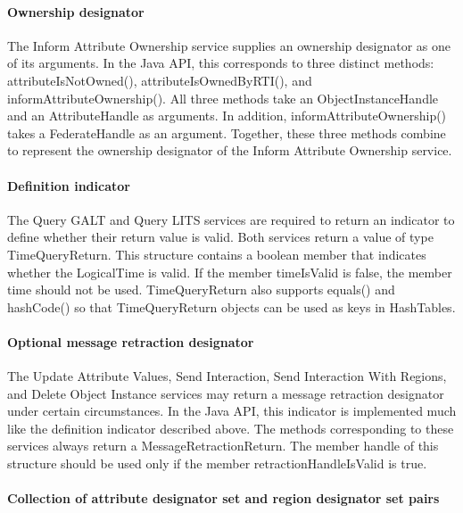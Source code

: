 \begin{compactstdpage}
    \paragraph{Ownership designator}

    The Inform Attribute Ownership \rtiinitiated{} service supplies an ownership designator as one of its arguments. In the Java API, this corresponds to three distinct methods: attributeIsNotOwned(), attributeIsOwnedByRTI(), and informAttributeOwnership(). All three methods take an ObjectInstanceHandle and an AttributeHandle as arguments. In addition, informAttributeOwnership() takes a FederateHandle as an argument. Together, these three methods combine to represent the ownership designator of the Inform Attribute Ownership \rtiinitiated{} service.

    \paragraph{Definition indicator}

    The Query GALT and Query LITS services are required to return an indicator to define whether their return value is valid. Both services return a value of type TimeQueryReturn. This structure contains a boolean member that indicates whether the LogicalTime is valid. If the member timeIsValid is false, the member time should not be used. TimeQueryReturn also supports equals() and hashCode() so that TimeQueryReturn objects can be used as keys in HashTables.

    \paragraph{Optional message retraction designator}

    The Update Attribute Values, Send Interaction, Send Interaction With Regions, and Delete Object Instance services may return a message retraction designator under certain circumstances. In the Java API, this indicator is implemented much like the definition indicator described above. The methods corresponding to these services always return a MessageRetractionReturn. The member handle of this structure should be used only if the member retractionHandleIsValid is true.

    \paragraph{Collection of attribute designator set and region designator set pairs}


\end{compactstdpage}
